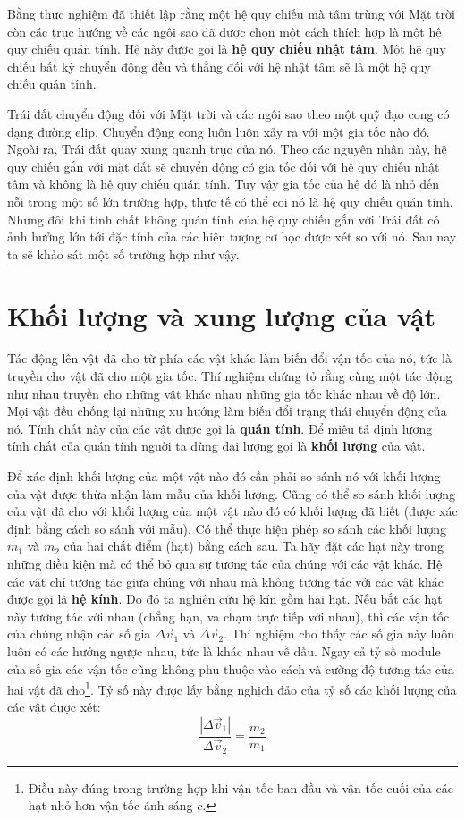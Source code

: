 Bằng thực nghiệm đã thiết lập rằng một hệ quy chiếu mà tâm trùng với Mặt trời còn các trục hướng về các ngôi sao đã được chọn một cách thích hợp là một hệ quy chiếu quán tính. Hệ này được gọi là \textbf{hệ quy chiếu nhật tâm}. Một hệ quy chiếu bất kỳ chuyển động đều và thẳng đối với hệ nhật tâm sẽ là một hệ quy chiếu quán tính.

Trái đất chuyển động đối với Mặt trời và các ngôi sao theo một quỹ đạo cong có dạng đường elip. Chuyển động cong luôn luôn xảy ra với một gia tốc nào đó. Ngoài ra, Trái đất quay xung quanh trục của nó. Theo các nguyên nhân này, hệ quy chiếu gắn với mặt đất sẽ chuyển động có gia tốc đối với hệ quy chiếu nhật tâm và không là hệ quy chiếu quán tính. Tuy vậy gia tốc của hệ đó là nhỏ đến nỗi trong một số lớn trường hợp, thực tế có thể coi nó là hệ quy chiếu quán tính. Nhưng đôi khi tính chất không quán tính của hệ quy chiếu gắn với Trái đất có ảnh hưởng lớn tới đặc tính của các hiện tượng cơ học được xét so với nó. Sau nay ta sẽ khảo sát một số trường hợp như vậy.

\section{Khối lượng và xung lượng của vật}\label{sec:2_3}

Tác động lên vật đã cho từ phía các vật khác làm biến đổi vận tốc của nó, tức là truyền cho vật đã cho một gia tốc. Thí nghiệm chứng tỏ rằng cùng một tác động như nhau truyền cho những vật khác nhau những gia tốc khác nhau về độ lớn. Mọi vật đều chống lại những xu hướng làm biến đổi trạng thái chuyển động của nó. Tính chất này của các vật được gọi là \textbf{quán tính}. Để miêu tả định lượng tính chất của quán tính nguời ta dùng đại lượng gọi là \textbf{khối lượng} của vật.

Để xác định khối lượng của một vật nào đó cần phải so sánh nó với khối lượng của vật được thừa nhận làm mẫu của khối lượng. Cũng có thể so sánh khối lượng của vật đã cho với khối lượng của một vật nào đó có khối lượng đã biết (được xác định bằng cách so sánh với mẫu). Có thể thực hiện phép so sánh các khối lượng $m_1$ và $m_2$ của hai chất điểm (hạt) bằng cách sau. Ta hãy đặt các hạt này trong những điều kiện mà có thể bỏ qua sự tương tác của chúng với các vật khác. Hệ các vật chỉ tương tác giữa chúng với nhau mà không tương tác với các vật khác được gọi là \textbf{hệ kính}. Do đó ta nghiên cứu hệ kín gồm hai hạt. Nếu bắt các hạt này tương tác với nhau (chẳng hạn, va chạm trực tiếp với nhau), thì các vận tốc của chúng nhận các số gia $\Delta\vec{v}_1$ và $\Delta\vec{v}_2$. Thí nghiệm cho thấy các số gia này luôn luôn có các hướng ngược nhau, tức là khác nhau về dấu. Ngay cả tỷ số module của số gia các vận tốc cũng không phụ thuộc vào cách và cường độ tương tác của hai vật đã cho\footnote{Điều này đúng trong trường hợp khi vận tốc ban đầu và vận tốc cuối của các hạt nhỏ hơn vận tốc ánh sáng $c$.}. Tỷ số này được lấy bằng nghịch đảo của tỷ số các khối lượng của các vật được xét:
\begin{equation}\label{eq:2_1}
\frac{|\Delta\vec{v}_1|}{\Delta\vec{v}_2} = \frac{m_2}{m_1}
\end{equation}

